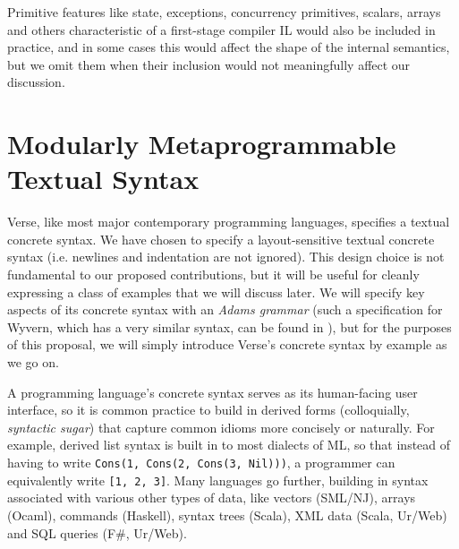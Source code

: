 Primitive features like state, exceptions, concurrency primitives, scalars, arrays and others characteristic of a first-stage compiler IL would also be included in practice, and in some cases this would affect the shape of the internal semantics, but we omit them when their inclusion would not meaningfully affect our discussion. %


\section{Modularly Metaprogrammable Textual Syntax}\label{sec:syntax}
Verse, like most major contemporary programming languages, specifies a textual concrete syntax. We have chosen to specify a layout-sensitive textual concrete syntax (i.e. newlines and indentation are not ignored). This design choice is not  fundamental to our proposed contributions, but it will be useful for cleanly expressing a class of examples that we will discuss later. We will specify key aspects of its concrete syntax with an \emph{Adams grammar} \cite{Adams:2013:PPI:2429069.2429129} (such a specification for Wyvern, which has a very similar syntax, can be found in \cite{TSLs}), but for the purposes of this proposal, we will simply introduce Verse's concrete syntax by example as we go on.

A programming language's concrete syntax serves as its human-facing user interface, so it is common practice to build in  derived forms (colloquially, \emph{syntactic sugar}) that capture common idioms more concisely or naturally. %
For example, derived list syntax is built in to most dialects of ML, so that instead of having to write \lstinline{Cons(1, Cons(2, Cons(3, Nil)))}, a programmer can equivalently write \lstinline{[1, 2, 3]}. Many languages go further, building in syntax associated with various other types of data, like vectors (SML/NJ), arrays (Ocaml), commands (Haskell), syntax trees (Scala), XML data (Scala, Ur/Web) and SQL queries (F\#, Ur/Web). %

